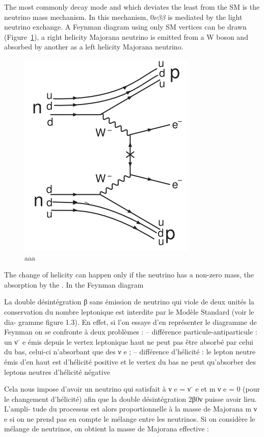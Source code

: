 \documentclass[main.tex]{subfiles}
\begin{document}
\NI The most commonly decay mode and which deviates the least from the SM is the neutrino mass mechanism. In this mechanism, 0$\nu\beta\beta$ is mediated by the light neutrino exchange. A Feynman diagram using only SM vertices can be drawn (Figure~\ref{0nubbFeynmanMassMechanism}), a right helicity Majorana neutrino is emitted from a W boson and absorbed by another as a left helicity Majorana neutrino.


\begin{figure}[h!]
\begin{center}
\includegraphics[scale=0.50]{pictures/Chap2/0nubbFeynmanMassMechanism.png}
\caption{aaa}
\label{0nubbFeynmanMassMechanism}
\end{center}
\end{figure}


\NI The change of helicity can happen only if the neutrino has a non-zero mass, the absorption by the  . In the Feynman diagram 


\ifx
La double désintégration β sans émission de neutrino qui viole de deux unités la
conservation du nombre leptonique est interdite par le Modèle Standard (voir le dia-
gramme figure 1.3). En effet, si l’on essaye d’en représenter le diagramme de Feynman
on se confronte à deux problèmes :
– différence particule-antiparticule : un ν  ̄ e émis depuis le vertex leptonique haut ne
peut pas être absorbé par celui du bas, celui-ci n’absorbant que des ν e ;
– différence d’hélicité : le lepton neutre émis d’en haut est d’hélicité positive et le
vertex du bas ne peut qu’absorber des leptons neutres d’hélicité négative


Cela nous impose d’avoir un neutrino qui satisfait à ν e = ν  ̄ e et m ν e = 0 (pour le
changement d’hélicité) afin que la double désintégration 2β0ν puisse avoir lieu. L’ampli-
tude du processus est alors proportionnelle à la masse de Majorana m ν e si on ne prend
pas en compte le mélange entre les neutrinos. Si on considère le mélange de neutrinos,
on obtient la masse de Majorana effective :
\fi
\bigskip
\end{document}
